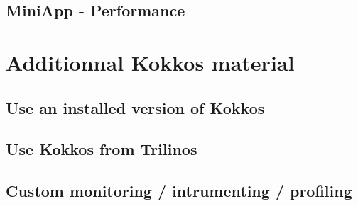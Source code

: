 \documentclass[9pt,hyperref={pdfpagemode=FullScreen,urlcolor=blue}]{beamer}
\begin{document}
\subsection{MiniApp - Performance}


\section*{Additionnal Kokkos material}

\subsection{Use an installed version of Kokkos}


\subsection{Use Kokkos from Trilinos}


\subsection{Custom monitoring / intrumenting / profiling}





\end{document}
